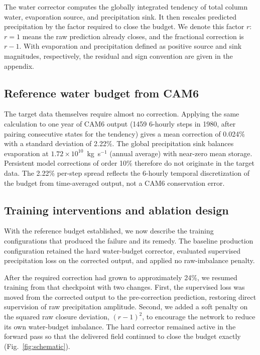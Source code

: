 \documentclass{ametsocV6.1}
\begin{document}
The water corrector computes the globally integrated tendency of total column water, evaporation source, and precipitation sink. It then rescales predicted precipitation by the factor required to close the budget. We denote this factor $r$: $r=1$ means the raw prediction already closes, and the fractional correction is $r-1$. With evaporation and precipitation defined as positive source and sink magnitudes, respectively, the residual and sign convention are given in the appendix.

\subsection{Reference water budget from CAM6}

The target data themselves require almost no correction. Applying the same calculation to one year of CAM6 output (1459 6-hourly steps in 1980, after pairing consecutive states for the tendency) gives a mean correction of 0.024\% with a standard deviation of 2.22\%. The global precipitation sink balances evaporation at $1.72\times10^{10}$~kg~s$^{-1}$ (annual average) with near-zero mean storage. Persistent model corrections of order 10\% therefore do not originate in the target data. The 2.22\% per-step spread reflects the 6-hourly temporal discretization of the budget from time-averaged output, not a CAM6 conservation error.

\subsection{Training interventions and ablation design}\label{sec:fix}

With the reference budget established, we now describe the training configurations that produced the failure and its remedy. The baseline production configuration retained the hard water-budget corrector, evaluated supervised precipitation loss on the corrected output, and applied no raw-imbalance penalty.

After the required correction had grown to approximately 24\%, we resumed training from that checkpoint with two changes. First, the supervised loss was moved from the corrected output to the pre-correction prediction, restoring direct supervision of raw precipitation amplitude. Second, we added a soft penalty on the squared raw closure deviation, $(r-1)^2$, to encourage the network to reduce its own water-budget imbalance. The hard corrector remained active in the forward pass so that the delivered field continued to close the budget exactly (Fig.~\ref{fig:schematic}).
\end{document}
